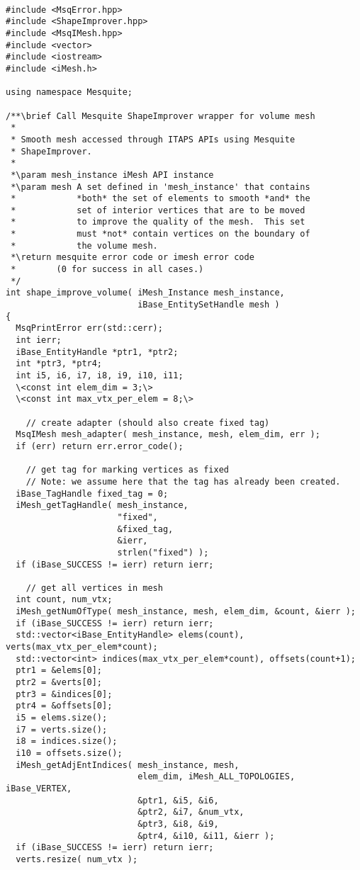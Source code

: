 \begin{lstlisting}

#include <MsqError.hpp>
#include <ShapeImprover.hpp>
#include <MsqIMesh.hpp>
#include <vector>
#include <iostream>
#include <iMesh.h>

using namespace Mesquite;

/**\brief Call Mesquite ShapeImprover wrapper for volume mesh
 *
 * Smooth mesh accessed through ITAPS APIs using Mesquite
 * ShapeImprover.
 *
 *\param mesh_instance iMesh API instance
 *\param mesh A set defined in 'mesh_instance' that contains
 *            *both* the set of elements to smooth *and* the
 *            set of interior vertices that are to be moved
 *            to improve the quality of the mesh.  This set
 *            must *not* contain vertices on the boundary of
 *            the volume mesh.
 *\return mesquite error code or imesh error code
 *        (0 for success in all cases.)
 */
int shape_improve_volume( iMesh_Instance mesh_instance,
                          iBase_EntitySetHandle mesh )
{
  MsqPrintError err(std::cerr);
  int ierr;
  iBase_EntityHandle *ptr1, *ptr2;
  int *ptr3, *ptr4;
  int i5, i6, i7, i8, i9, i10, i11;
  \<const int elem_dim = 3;\>
  \<const int max_vtx_per_elem = 8;\>
  
    // create adapter (should also create fixed tag)
  MsqIMesh mesh_adapter( mesh_instance, mesh, elem_dim, err );
  if (err) return err.error_code();

    // get tag for marking vertices as fixed
    // Note: we assume here that the tag has already been created.
  iBase_TagHandle fixed_tag = 0;
  iMesh_getTagHandle( mesh_instance,
                      "fixed",
                      &fixed_tag,
                      &ierr,
                      strlen("fixed") );
  if (iBase_SUCCESS != ierr) return ierr;

    // get all vertices in mesh
  int count, num_vtx;
  iMesh_getNumOfType( mesh_instance, mesh, elem_dim, &count, &ierr );
  if (iBase_SUCCESS != ierr) return ierr;
  std::vector<iBase_EntityHandle> elems(count), verts(max_vtx_per_elem*count);
  std::vector<int> indices(max_vtx_per_elem*count), offsets(count+1);
  ptr1 = &elems[0];
  ptr2 = &verts[0];
  ptr3 = &indices[0];
  ptr4 = &offsets[0];
  i5 = elems.size();
  i7 = verts.size();
  i8 = indices.size();
  i10 = offsets.size();
  iMesh_getAdjEntIndices( mesh_instance, mesh, 
                          elem_dim, iMesh_ALL_TOPOLOGIES, iBase_VERTEX,
                          &ptr1, &i5, &i6,
                          &ptr2, &i7, &num_vtx,
                          &ptr3, &i8, &i9,
                          &ptr4, &i10, &i11, &ierr );
  if (iBase_SUCCESS != ierr) return ierr;
  verts.resize( num_vtx );


\end{lstlisting}
